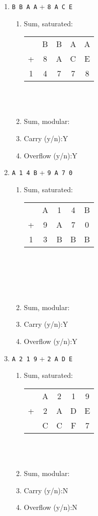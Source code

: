\documentclass[11pt]{article}
\begin{document}
\begin{enumerate}
\item \texttt{B B A A} \quad + \quad \texttt{8 A C E}
\begin{enumerate}
\item Sum, saturated:\\
\begin{tabular}{c c c c c}
&B&B&A&A\\
+&8&A&C&E\\
\hline
1&4&7&7&8
\end{tabular}\\

\\
\item Sum, modular: \\
\item Carry (y/n):Y
\item Overflow (y/n):Y
\end{enumerate}

\item \texttt{A 1 4 B} \quad + \quad \texttt{9 A 7 0}
\begin{enumerate}
\item Sum, saturated:\\
\begin{tabular}{c c c c c}
&A&1&4&B\\
+&9&A&7&0\\
\hline
1&3&B&B&B
\end{tabular}\\[2pt]
\\[2pt]
\\\
\item Sum, modular: \\
\item Carry (y/n):Y
\item Overflow (y/n):Y
\end{enumerate}

\item \texttt{A 2 1 9} \quad + \quad \texttt{2 A D E}
\begin{enumerate}
\item Sum, saturated:\\[2pt]
\begin{tabular}{c c c c c}
&A&2&1&9\\
+&2&A&D&E\\
\hline
&C&C&F&7
\end{tabular}\\[2pt]
\\
\item Sum, modular: 
\item Carry (y/n):N 
\item Overflow (y/n):N
\end{enumerate}


\end{enumerate}
\end{document}
